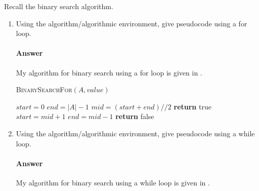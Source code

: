 \documentclass{article}
\begin{document}
 

Recall the binary search algorithm.

\begin{enumerate}
    \item Using the algorithm/algorithmic environment,
        give pseudocode using a for loop.

        \paragraph{Answer} My algorithm for binary search using a for loop is given in .

        \begin{algorithm}
            \caption{\textsc{BinarySearchFor}$(A, value)$}\label{alg:forloop}
            \begin{algorithmic}
            \State $start = 0$
            \State$ end = |A|-1$
                	\State $mid = (start + end) // 2$
            			\State \textbf{return} true
					\State $start = mid + 1$
				\Else{}
					\State $end = mid-1$
      			\EndIf
                \EndFor
                \State \textbf{return} false
            \end{algorithmic}
        \end{algorithm}

    \item Using the algorithm/algorithmic environment, give pseudocode using a while loop.

        \paragraph{Answer} My algorithm for binary search using a while loop is given in .


\end{enumerate}
\end{document}
